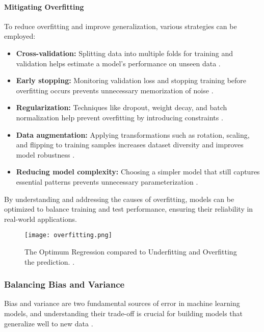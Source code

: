 \paragraph{Mitigating Overfitting} 
To reduce overfitting and improve generalization, various strategies can be employed:

\begin{itemize}
    \item \textbf{Cross-validation:} Splitting data into multiple folds for training and validation helps estimate a model's performance on unseen data \cite{kohavi1995study}.
    \item \textbf{Early stopping:} Monitoring validation loss and stopping training before overfitting occurs prevents unnecessary memorization of noise \cite{prechelt1998early}.
    \item \textbf{Regularization:} Techniques like dropout, weight decay, and batch normalization help prevent overfitting by introducing constraints \cite{srivastava2014dropout}.
    \item \textbf{Data augmentation:} Applying transformations such as rotation, scaling, and flipping to training samples increases dataset diversity and improves model robustness \cite{shorten2019survey}.
    \item \textbf{Reducing model complexity:} Choosing a simpler model that still captures essential patterns prevents unnecessary parameterization \cite{domingos2012few}.
\end{itemize}

By understanding and addressing the causes of overfitting, models can be optimized to balance training and test performance, ensuring their reliability in real-world applications.


\begin{figure}[H]
    \centering
    \texttt{[image: overfitting.png]}
    \caption{The Optimum Regression compared to Underfitting and Overfitting the prediction. \cite{aimultiple2024overfitting}.}
    \label{fig:overfitting}
    \end{figure}

\subsubsection{Balancing Bias and Variance}
Bias and variance are two fundamental sources of error in machine learning models, and understanding their trade-off is crucial for building models that generalize well to new data \cite{geman1992neural}.

